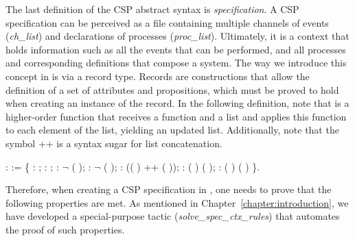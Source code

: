 The last definition of the CSP abstract syntax is \emph{specification}. A CSP specification can be perceived as a file containing multiple channels of events (\emph{ch\_list}) and declarations of processes (\emph{proc\_list}). Ultimately, it is a context that holds information such as all the events that can be performed, and all processes and corresponding definitions that compose a system. The way we introduce this concept in \CSPcoq{} is via a record type. Records are constructions that allow the definition of a set of attributes and propositions, which must be proved to hold when creating an instance of the record. In the following definition, note that  is a higher-order function that receives a function and a list and applies this function to each element of the list, yielding an updated list. Additionally, note that the symbol ++ is a syntax sugar for list concatenation.

\begin{coqdoccode}
	\coqdocnoindent
	  :  :=  \{\coqdoceol
	\coqdocindent{1.00em}
	 :  ;\coqdoceol
	\coqdocindent{1.00em}
	 :  ;\coqdoceol
	\coqdocindent{1.00em}
	 : \ensuremath{\lnot}   (  );\coqdoceol
	\coqdocindent{1.00em}
	 : \ensuremath{\lnot}   ( );\coqdoceol
	\coqdocindent{1.00em}
	 :
	\coqdoceol
	\coqdocindent{2.00em}  (( ) ++ (  ));\coqdoceol
	\coqdocindent{1.00em}
	 :  ( ) (  );\coqdoceol
	\coqdocindent{1.00em}
	 :  ( ) ( )\coqdoceol
	\coqdocnoindent
	\}.\coqdoceol
\end{coqdoccode}

Therefore, when creating a CSP specification in \CSPcoq{}, one needs to prove that the following properties are met. As mentioned in Chapter~\ref{chapter:introduction}, we have developed a special-purpose tactic (\emph{solve\_spec\_ctx\_rules}) that automates the proof of such properties.

